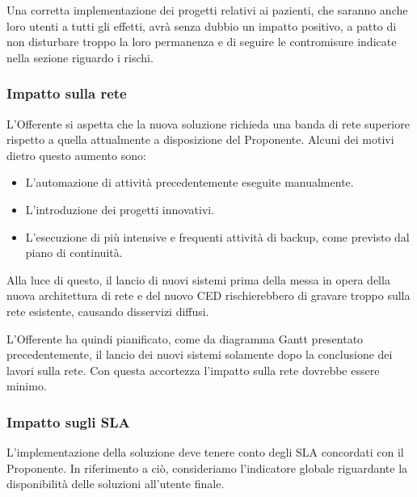                 
                Una corretta implementazione dei progetti relativi ai pazienti, che saranno anche loro utenti a tutti gli effetti, avrà senza dubbio un impatto positivo, a patto di non disturbare troppo la loro permanenza e di seguire le contromisure indicate nella sezione riguardo i rischi.
                        
			\subsubsection{Impatto sulla rete}
				L'Offerente si aspetta che la nuova soluzione richieda una banda di rete superiore rispetto a quella attualmente a disposizione del Proponente. Alcuni dei motivi dietro questo aumento sono: 
                \begin{itemize}
                	\item L'automazione di attività precedentemente eseguite manualmente.
                    \item  L'introduzione dei progetti innovativi.
                	\item L'esecuzione di più intensive e frequenti attività di backup, come previsto dal piano di continuità.
                \end{itemize}
                Alla luce di questo, il lancio di nuovi sistemi prima della messa in opera della nuova architettura di rete e del nuovo CED rischierebbero di gravare troppo sulla rete esistente, causando disservizi diffusi. 
                
                
                L'Offerente ha quindi pianificato, come da diagramma Gantt presentato precedentemente, il lancio dei nuovi sistemi solamente dopo la conclusione dei lavori sulla rete. Con questa accortezza l'impatto sulla rete dovrebbe essere minimo.
                
			\subsubsection{Impatto sugli SLA}
				L'implementazione della soluzione deve tenere conto degli SLA concordati con il Proponente. In riferimento a ciò, consideriamo l'indicatore globale riguardante la disponibilità delle soluzioni all'utente finale.                
				
